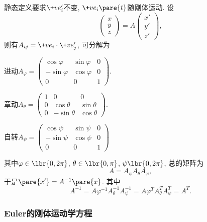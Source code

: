 \documentclass[../LectureNotes.tex]{subfiles}
\begin{document}
静态定义要求$\+ve'_i$不变, $\+ve_i\pare{t}$随刚体运动. 设
\[ \begin{pmatrix}
    x \\ y \\ z
\end{pmatrix} = A \begin{pmatrix}
    x' \\ y' \\ z'
\end{pmatrix}, \]
则有$A_{ij} = \+ve_i\cdot\+ve'_j$, 可分解为
\begin{cenum}
    \item 进动$\displaystyle A_\varphi = \begin{pmatrix}
        \cos\varphi & \sin\varphi & 0 \\
        -\sin\varphi & \cos\varphi & 0 \\
        0 & 0 & 1
    \end{pmatrix}$.
    \item 章动$A_\theta = \displaystyle \begin{pmatrix}
        1 & 0 & 0 \\
        0 & \cos\theta & \sin\theta \\
        0 & -\sin\theta & \cos\theta
    \end{pmatrix}$.
    \item 自转$\displaystyle A_\psi = \begin{pmatrix}
        \cos\psi & \sin\psi & 0 \\
        -\sin\psi & \cos\psi & 0 \\
        0 & 0 & 1
    \end{pmatrix}$
\end{cenum}
其中$\varphi \in \lbr{0,2\pi}$, $\theta\in\lbr{0,\pi}$, $\psi\lbr{0,2\pi}$, 总的矩阵为
\[ A = A_\psi A_\theta A_\varphi, \]
于是$\pare{x'} = A^{-1}\pare{x}$. 其中
\[ A^{-1} = A\varphi^{-1}A_\theta^{-1}A_\psi^{-1} = A\varphi^{T}A_\theta^{T}A_\psi^{T} = A^T. \]


\subsubsection{Euler的刚体运动学方程} %
\label{ssub:euler的刚体运动学方程}
\end{document}
